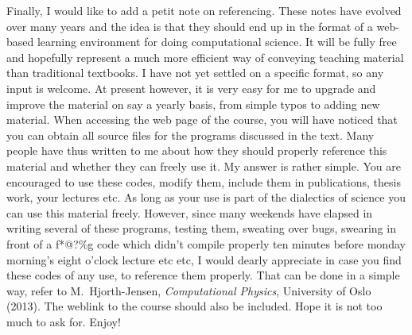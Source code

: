 Finally, I would like to add a petit note on referencing. These notes
have evolved over many years and the idea is that they should end up
in the format of a web-based learning environment for doing
computational science. It will be fully free and hopefully represent a
much more efficient way of conveying teaching material than
traditional textbooks.  I have not yet settled on a specific format,
so any input is welcome. At present however, it is very easy for me to
upgrade and improve the material on say a yearly basis, from simple
typos to adding new material.  When accessing the web page of the
course, you will have noticed that you can obtain all source files for
the programs discussed in the text.  Many people have thus written to
me about how they should properly reference this material and whether
they can freely use it. My answer is rather simple.  You are
encouraged to use these codes, modify them, include them in
publications, thesis work, your lectures etc.  As long as your use is
part of the dialectics of science you can use this material freely.
However, since many weekends have elapsed in writing several of these
programs, testing them, sweating over bugs, swearing in front of a
f*@?\%g code which didn't compile properly ten minutes before monday
morning's eight o'clock lecture etc etc, I would dearly appreciate in
case you find these codes of any use, to reference them properly. That
can be done in a simple way, refer to M.~Hjorth-Jensen, {\em
Computational Physics}, University of Oslo (2013). The weblink to the
course should also be included. Hope it is not too much to ask
for. Enjoy!
